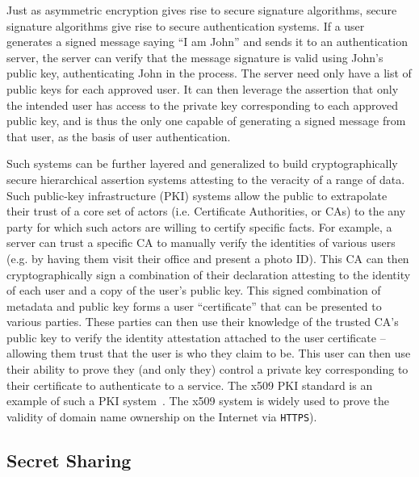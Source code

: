 Just as asymmetric encryption gives rise to secure signature
algorithms, secure signature algorithms give rise to secure
authentication systems. If a user generates a signed message saying
``I am John'' and sends it to an authentication server, the server can
verify that the message signature is valid using John's public key,
authenticating John in the process. The server need only have a list
of public keys for each approved user. It can then leverage the
assertion that only the intended user has access to the private key
corresponding to each approved public key, and is thus the only one
capable of generating a signed message from that user, as the basis of
user authentication.

Such systems can be further layered and generalized to build
cryptographically secure hierarchical assertion systems attesting to
the veracity of a range of data. Such public-key infrastructure (PKI)
systems allow the public to extrapolate their trust of a core set of
actors (i.e. Certificate Authorities, or CAs) to the any party for
which such actors are willing to certify specific facts. For example,
a server can trust a specific CA to manually verify the identities of
various users (e.g. by having them visit their office and present a
photo ID). This CA can then cryptographically sign a combination of
their declaration attesting to the identity of each user and a copy of
the user's public key. This signed combination of metadata and public
key forms a user ``certificate'' that can be presented to various
parties. These parties can then use their knowledge of the trusted
CA's public key to verify the identity attestation attached to the
user certificate -- allowing them trust that the user is who they
claim to be. This user can then use their ability to prove they (and
only they) control a private key corresponding to their certificate to
authenticate to a service. The x509 PKI standard is an example of such
a PKI system~\cite{rfc5280}. The x509 system is widely used to prove
the validity of domain name ownership on the Internet via
\texttt{HTTPS}).

\subsection{Secret Sharing}

